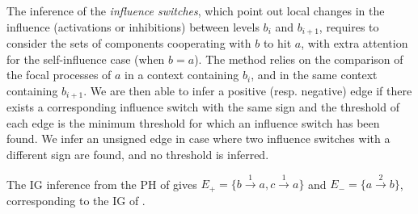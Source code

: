 The inference of the \emph{influence switches}, which point out local changes in the influence (activations or inhibitions) between levels $b_i$ and $b_{i+1}$, requires to consider the sets of components cooperating with $b$ to hit $a$, with extra attention for the self-influence case (when $b = a$).
The method relies on the comparison of the focal processes of $a$ in a context containing $b_i$, and in the same context containing $b_{i+1}$.
We are then able to infer a positive (resp. negative) edge if there exists a corresponding influence switch with the same sign and the threshold of each edge is the minimum threshold for which an influence switch has been found.
We infer an unsigned edge in case where two influence switches with a different sign are found, and no threshold is inferred.

\begin{example*}
The IG inference from the PH of  gives
$E_+ = \{b \xrightarrow{1} a, c \xrightarrow{1} a\}$ and
$E_- = \{a \xrightarrow{2} b\}$, corresponding to the IG of .
\end{example*}
